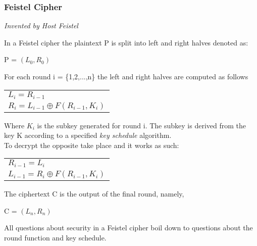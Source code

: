 \documentclass{article}
\begin{document}
\subsubsection{Feistel Cipher}
\begin{center}
    \textit{Invented by Host Feistel}
\end{center}
In a Feistel cipher the plaintext P is split into left and right halves denoted as:
\begin{center}
    P = $(L_0,R_0)$
\end{center}{}
For each round i = \{1,2,...,n\} the left and right halves are computed as follows
\begin{center}
\begin{tabular}{l}
    $L_i = R_{i-1}$\\
    $R_i = L_{i-1} \oplus F(R_{i-1}, K_i) $
\end{tabular}{}
\end{center}{}
Where $K_i$ is the subkey generated for round i. The subkey is derived from the key K according to a specified \textit{key schedule} algorithm.\\
To decrypt the opposite take place and it works as such:
\begin{center}
\begin{tabular}{l}
    $R_{i-1} = L_{i}$\\
    $L_{i-1} = R_i \oplus F(R_{i-1}, K_i) $
\end{tabular}{}
\end{center}{}
The ciphertext C is the output of the final round, namely,
\begin{center}
    C = $(L_n, R_n)$
\end{center}
All questions about security in a Feistel cipher boil down to questions about the round function and key schedule.
\end{document}
